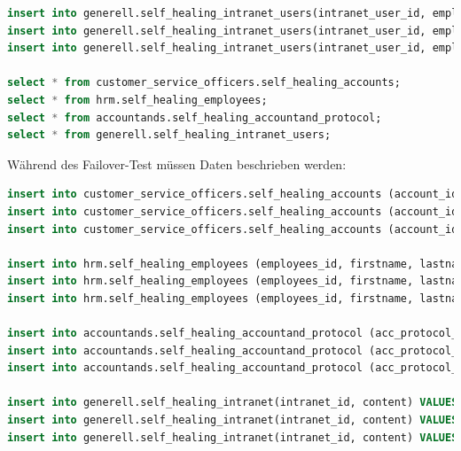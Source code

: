 \begin{lstlisting}[language=sql, caption=Patroni - Self Healing Tests - Init Data,captionpos=b,label={lst:patroni-self-healing-init-data},breaklines=true]
insert into generell.self_healing_intranet_users(intranet_user_id, employees_id) values(100, 100);
insert into generell.self_healing_intranet_users(intranet_user_id, employees_id) values(200, 200);
insert into generell.self_healing_intranet_users(intranet_user_id, employees_id) values(300, 300);

select * from customer_service_officers.self_healing_accounts;
select * from hrm.self_healing_employees;
select * from accountands.self_healing_accountand_protocol;
select * from generell.self_healing_intranet_users;
\end{lstlisting}

Während des \Gls{Failover}-Test müssen Daten beschrieben werden:
\lstset{style=gra_codestyle}
\begin{lstlisting}[language=sql, caption=Patroni - Self Healing Tests - Failover Data,captionpos=b,label={lst:patroni-self-healing-failover-data},breaklines=true]
insert into customer_service_officers.self_healing_accounts (account_id, firstname, lastname, birthday) VALUES (400, 'i', 'j', '01.01.2005');
insert into customer_service_officers.self_healing_accounts (account_id, firstname, lastname, birthday) VALUES (500, 'k', 'l', '01.01.2003');
insert into customer_service_officers.self_healing_accounts (account_id, firstname, lastname, birthday) VALUES (600, 'm', 'n', '01.01.2001');

insert into hrm.self_healing_employees (employees_id, firstname, lastname, birthday) VALUES (400, 'i', 'j', '01.01.2005');
insert into hrm.self_healing_employees (employees_id, firstname, lastname, birthday) VALUES (500, 'k', 'l', '01.01.2003');
insert into hrm.self_healing_employees (employees_id, firstname, lastname, birthday) VALUES (600, 'm', 'n', '01.01.2001');

insert into accountands.self_healing_accountand_protocol (acc_protocol_id, description, protocol_date, employees_id, rapport)  values (400, 'bla', '07.04.2024', 200, 'blabla');
insert into accountands.self_healing_accountand_protocol (acc_protocol_id, description, protocol_date, employees_id, rapport)  values (500, 'yada', '07.04.2024', 600, 'ydayadyada');
insert into accountands.self_healing_accountand_protocol (acc_protocol_id, description, protocol_date, employees_id, rapport)  values (1000, 'something', '07.04.2024', 300, 'something');

insert into generell.self_healing_intranet(intranet_id, content) VALUES (200, 'yadada');
insert into generell.self_healing_intranet(intranet_id, content) VALUES (600, 'bla bla');
insert into generell.self_healing_intranet(intranet_id, content) VALUES (900, 'talking and talking');


\end{lstlisting}
